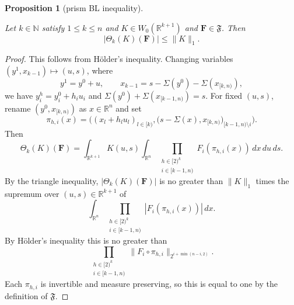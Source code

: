 \documentclass[12pt,reqno]{amsart}
\theoremstyle{plain}
\newtheorem{proposition}[theorem]{Proposition}
\numberwithin{equation}{section}
\theoremstyle{remark}
\newcommand{\uses}[1]{}
\newcommand{\usesdefs}[1]{}
\newcommand{\leanok}{}
\newcommand{\lean}[1]{}
\newcommand{\R}{{\mathbb R}}
\newcommand{\N}{{\mathbb N}}
\newcommand{\F}{\mathbf{F}}
\begin{document}
\begin{proposition}[prism BL inequality]\label{prism BL inequality}\uses{}\usesdefs{auto:Wiener-space-definition,normalized function tuples,prism Brascamp--Lieb}
\lean{Auto.prismBLInequality}
\leanok

Let $k\in\N$ satisfy $1\le k\le n$ and $K\in W_0(\R^{k+1})$ and $\F\in \mathfrak{F}$. Then
\begin{equation}\label{prism-k-bound}
   |\Theta_k(K)(\F)| \le \|K\|_1.
\end{equation}
\end{proposition}

\begin{proof}
This follows from H\"older's inequality.
Changing variables $(y^1,x_{k-1})\mapsto (u,s)$, where
\[
y^1=y^0+u,\qquad x_{k-1}=s-\Sigma(y^0)-\Sigma(x_{[k,n)}),
\]
we have $y_i^h=y_i^0+h_iu_i$ and
$\Sigma(y^0)+\Sigma(x_{[k-1,n)})=s$. For fixed $(u,s)$, rename
$(y^0,x_{[k,n)})$ as $x\in\R^n$ and set
\[
\pi_{h,i}(x)
=
\Big((x_l+h_lu_l)_{l\in [k)},
\big(s-\Sigma(x),x_{[k,n)}\big)_{[k-1,n)\setminus i}\Big).
\]
Then
\[
\Theta_k(K)(\F)
=
\int_{\R^{k+1}} K(u,s)
\int_{\R^n}
\prod_{\substack{h\in [2)^k\\ i\in [k-1,n)}}
F_i(\pi_{h,i}(x))
\,dx\,du\,ds.
\]
By the triangle inequality, $|\Theta_k(K)(\F)|$ is no greater than $\|K\|_1$ times the supremum over $(u,s)\in\R^{k+1}$ of
\[
\int_{\R^n}
\prod_{\substack{h\in [2)^k\\ i\in [k-1,n)}}
|F_i(\pi_{h,i}(x))|
\,dx.
\]
By H\"older's inequality this is no greater than
\[
\prod_{\substack{h\in [2)^k\\ i\in [k-1,n)}}
\|F_i\circ\pi_{h,i}\|_{2^{i+\min(n-i,2)}}.
\]
Each $\pi_{h,i}$ is invertible and measure preserving, so this is equal to one by the definition of $\mathfrak{F}$.
\end{proof}
\end{document}
